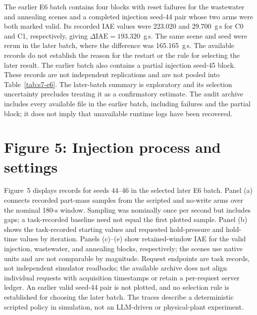 \documentclass[10pt]{article}
\begin{document}
The earlier E6 batch contains four blocks with reset failures for the wastewater and annealing scenes and a completed injection seed-44 pair whose two arms were both marked valid. Its recorded IAE values were 223.020 and 29.700~g\,s for C0 and C1, respectively, giving $\Delta\mathrm{IAE}=193.320$~g\,s. The same scene and seed were rerun in the later batch, where the difference was 165.165~g\,s. The available records do not establish the reason for the restart or the rule for selecting the later result. The earlier batch also contains a partial injection seed-45 block. These records are not independent replications and are not pooled into Table~\ref{tab:s7-e6}. The later-batch summary is exploratory and its selection uncertainty precludes treating it as a confirmatory estimate. The audit archive includes every available file in the earlier batch, including failures and the partial block; it does not imply that unavailable runtime logs have been recovered.

\section*{Figure 5: Injection process and settings}
Figure~5 displays records for seeds 44--46 in the selected later E6 batch. Panel (a) connects recorded part-mass samples from the scripted and no-write arms over the nominal 180-s window. Sampling was nominally once per second but includes gaps; a task-recorded baseline need not equal the first plotted sample. Panel (b) shows the task-recorded starting values and requested hold-pressure and hold-time values by iteration. Panels (c)--(e) show retained-window IAE for the valid injection, wastewater, and annealing blocks, respectively; the scenes use native units and are not comparable by magnitude. Request endpoints are task records, not independent simulator readbacks; the available archive does not align individual requests with acquisition timestamps or retain a per-request server ledger. An earlier valid seed-44 pair is not plotted, and no selection rule is established for choosing the later batch. The traces describe a deterministic scripted policy in simulation, not an LLM-driven or physical-plant experiment.
\end{document}
